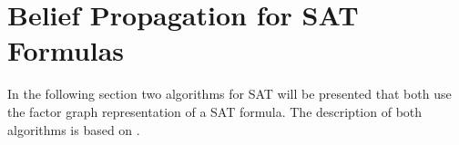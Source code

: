 \chapter{Belief Propagation for SAT Formulas}\label{BPFS}
In the following section two algorithms for SAT will be presented that both use the factor graph representation of a SAT formula. The description of both algorithms is based on \cite{survprob}.







